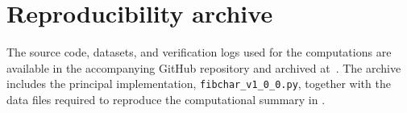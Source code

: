 \documentclass[preprint,12pt]{elsarticle}
\numberwithin{equation}{section}
\theoremstyle{plain}
\theoremstyle{definition}
\begin{document}
\section{Reproducibility archive}\label{app:software}
 
The source code, datasets, and verification logs used for the
computations are available in the accompanying GitHub repository and
archived at~\cite{Ghandali2026}. The archive includes the principal
implementation, \texttt{fibchar\_v1\_0\_0.py}, together with the data
files required to reproduce the computational summary in
.
 

 
\end{document}
